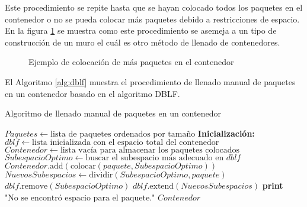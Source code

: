 Este procedimiento se repite hasta que se hayan colocado todos los paquetes en el contenedor o no se pueda colocar más paquetes debido a restricciones de espacio. En la figura \ref{fig:contruccion_muro} se muestra como este procedimiento se asemeja a un tipo de construcción de un muro el cuál es otro método de llenado de contenedores.

\begin{figure}[H]
    \centering
    
    \caption{Ejemplo de colocación de más paquetes en el contenedor}
    \label{fig:contruccion_muro}
\end{figure}

El Algoritmo \ref{alg:dblf} muestra el procedimiento de llenado manual de paquetes en un contenedor basado en el algoritmo DBLF.

\begin{algorithm}[H]
\caption{Algoritmo de llenado manual de paquetes en un contenedor}
\label{alg:dblf}
\begin{algorithmic}[1]
    \State $Paquetes \gets \text{lista de paquetes ordenados por tamaño}$
    \State \textbf{Inicialización:} $dblf \gets \text{lista inicializada con el espacio total del contenedor}$
    \State $Contenedor \gets \text{lista vacía para almacenar los paquetes colocados}$
        \State $SubespacioOptimo \gets \text{buscar el subespacio más adecuado en } dblf$
            \State $Contenedor.\text{add}( \text{colocar}(paquete, SubespacioOptimo) )$
            \State $NuevosSubespacios \gets \text{dividir}(SubespacioOptimo, paquete)$
            \State $dblf.\text{remove}(SubespacioOptimo)$
            \State $dblf.\text{extend}(NuevosSubespacios)$
        \Else
            \State \textbf{print} $\text{"No se encontró espacio para el paquete."}$
        \EndIf
    \EndFor
    \State \Return $Contenedor$
\end{algorithmic}
\end{algorithm}

